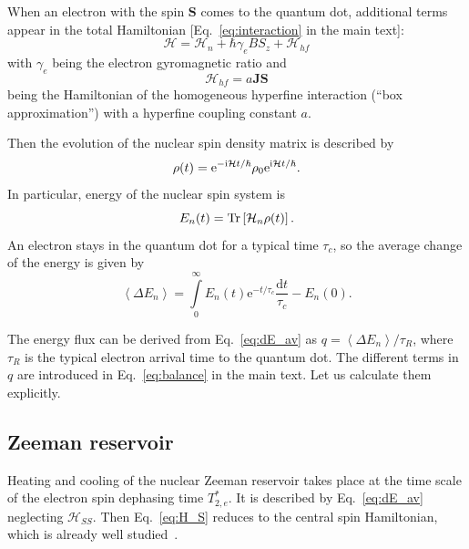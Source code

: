 \documentclass[prl,nobibnotes,twocolumn,aps,longbibliography,superscriptaddress,notoc]{revtex4-1}
\newcommand{\Tr}{\mathop{\rm Tr}}
\newcommand{\e}{\mathrm{e}}
\renewcommand{\i}{{\rm i}}
\renewcommand{\d}{\mathrm d}
\newcommand{\braket}[1]{\left\langle #1 \right\rangle}
\begin{document}
When an electron with the spin $\bm S$ comes to the quantum dot, additional terms appear in the total Hamiltonian [Eq.~\eqref{eq:interaction} in the main text]:
\begin{equation}
  \label{eq:H_S}
  \mathcal H=\mathcal H_n+\hbar\gamma_eBS_z+\mathcal H_{hf}
\end{equation}
with $\gamma_e$ being the electron gyromagnetic ratio and
\begin{equation}
  \mathcal H_{hf}=a\bm J\bm S
\end{equation}
being the Hamiltonian of the homogeneous hyperfine interaction (``box approximation'') with a hyperfine coupling constant $a$.

Then the evolution of the nuclear spin density matrix is described by
\begin{equation}
  \label{eq:rho_t}
  \rho(t)=\e^{-\i\mathcal H t/\hbar}\rho_0\e^{\i\mathcal H t/\hbar}.
\end{equation}
In particular, energy of the nuclear spin system is
\begin{equation}
  \label{eq:En}
  E_n(t)=\Tr\left[\mathcal H_n\rho(t)\right].
\end{equation}
An electron stays in the quantum dot for a typical time $\tau_c$, so the average change of the energy is given by
\begin{equation}
  \label{eq:dE_av}
  \braket{\Delta E_n}=\int\limits_0^\infty E_n(t)\e^{-t/\tau_c}\frac{\d t}{\tau_c}-E_n(0).
\end{equation}

The energy flux can be derived from Eq.~\eqref{eq:dE_av} as $q=\braket{\Delta E_n}/\tau_R$, where $\tau_R$ is the typical electron arrival time to the quantum dot. The different terms in $q$ are introduced in Eq.~\eqref{eq:balance} in the main text. Let us calculate them explicitly.

\subsection{Zeeman reservoir}

Heating and cooling of the nuclear Zeeman reservoir takes place at the time scale of the electron spin dephasing time $T_{2,e}^*$. It is described by Eq.~\eqref{eq:dE_av} neglecting $\mathcal H_{SS}$. Then Eq.~\eqref{eq:H_S} reduces to the central spin Hamiltonian, which is already well studied~\cite{S_book_Glazov}.
\end{document}
